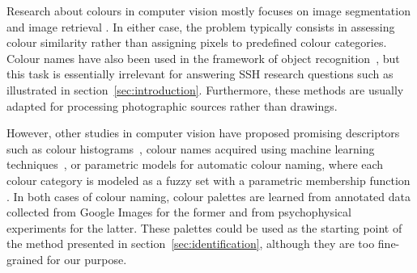 \documentclass[11pt,a4paper]{article}
\begin{document}
Research about colours in computer vision mostly focuses on image segmentation \cite[see e.g.][]{ChengSun2000,ChenPappasMojsilovicEtAl2005,HanmandluVermaSusanEtAl2013} and image retrieval \cite[see e.g.][]{DengManjunathKenneyEtAl2001,RaoKumar2015,ZhangZhangYaoEtAl2016}. In either case, the problem typically consists in assessing colour similarity rather than assigning pixels to predefined colour categories. Colour names have also been used in the framework of object recognition~\cite[see e.g.][]{khan2013}, but this task is essentially irrelevant for answering SSH research questions such as illustrated in section~\ref{sec:introduction}. Furthermore, these methods are usually adapted for processing photographic sources rather than drawings.




However, other studies in computer vision have proposed promising descriptors such as colour histograms~\cite[see e.g.][]{sun2006}, colour names acquired using machine learning techniques~\cite{weijer2009, lindner2013}, or parametric models for automatic colour naming, where each colour category is modeled as a fuzzy set with a parametric membership function \cite{benavente2008}. In both cases of colour naming, colour palettes are learned from annotated data collected from Google Images for the former and from psychophysical experiments for the latter. These palettes could be used as the starting point of the method presented in section~\ref{sec:identification}, although they are too fine-grained for our purpose.
\end{document}
